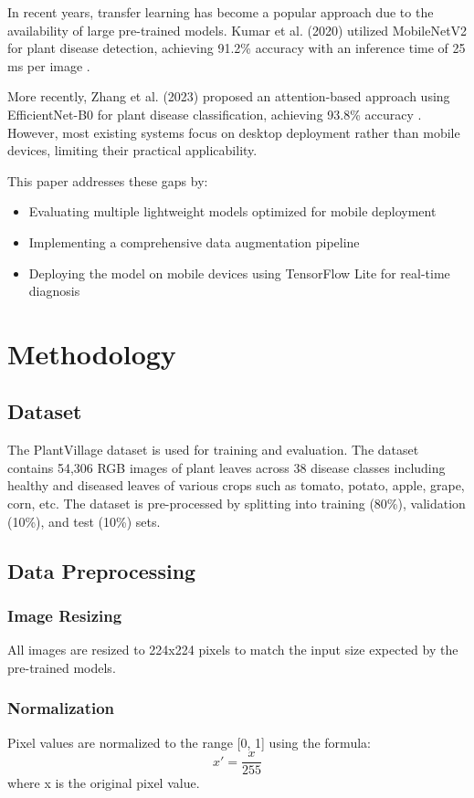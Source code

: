 \documentclass[conference]{IEEEtran}
\begin{document}
In recent years, transfer learning has become a popular approach due to the availability of large pre-trained models. Kumar et al. (2020) utilized MobileNetV2 for plant disease detection, achieving 91.2\% accuracy with an inference time of 25 ms per image \cite{kumar2020}. 

More recently, Zhang et al. (2023) proposed an attention-based approach using EfficientNet-B0 for plant disease classification, achieving 93.8\% accuracy \cite{zhang2023}. However, most existing systems focus on desktop deployment rather than mobile devices, limiting their practical applicability.

This paper addresses these gaps by:
\begin{itemize}
\item Evaluating multiple lightweight models optimized for mobile deployment
\item Implementing a comprehensive data augmentation pipeline
\item Deploying the model on mobile devices using TensorFlow Lite for real-time diagnosis
\end{itemize}

\section{Methodology}
\subsection{Dataset}
The PlantVillage dataset \cite{plantvillage} is used for training and evaluation. The dataset contains 54,306 RGB images of plant leaves across 38 disease classes including healthy and diseased leaves of various crops such as tomato, potato, apple, grape, corn, etc. The dataset is pre-processed by splitting into training (80\%), validation (10\%), and test (10\%) sets.

\subsection{Data Preprocessing}
\subsubsection{Image Resizing}
All images are resized to 224x224 pixels to match the input size expected by the pre-trained models.

\subsubsection{Normalization}
Pixel values are normalized to the range [0, 1] using the formula:
\begin{equation}
x' = \frac{x}{255}
\end{equation}
where x is the original pixel value.
\end{document}
